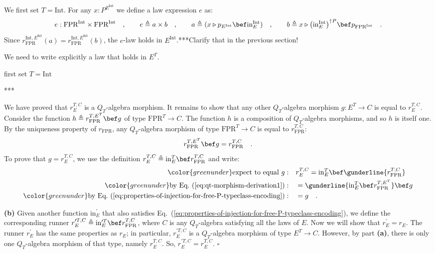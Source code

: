 We first set $T=\text{Int}$. For any $x:P^{E^{\text{Int}}}$ we define
a law expression $e$ as:
\[
e:\text{FPR}^{\text{Int}}\times\text{FPR}^{\text{Int}}\quad,\quad\quad e\triangleq a\times b\quad,\quad\quad a\triangleq(x\triangleright p_{E^{\text{Int}}}\bef\text{in}_{E}^{\text{Int}})\quad,\quad\quad b\triangleq x\triangleright\big(\text{in}_{E}^{\text{Int}}\big)^{\uparrow P}\bef p_{\text{FPR}^{\text{Int}}}\quad.
\]
Since $r_{\text{FPR}}^{\text{Int},E^{\text{Int}}}(a)=r_{\text{FPR}}^{\text{Int},E^{\text{Int}}}(b)$,
the $e$-law holds in $E^{\text{Int}}$.{*}{*}{*}Clarify that in the
previous section! 

We need to write explicitly a law that holds in $E^{T}$.

first set $T=\text{Int}$

{*}{*}{*}

We have proved that $r_{E}^{T,C}$ is a $Q_{T}$-algebra morphism.
It remains to show that any other $Q_{T}$-algebra morphism $g:E^{T}\rightarrow C$
is equal to $r_{E}^{T,C}$. Consider the function $h\triangleq r_{\text{FPR}}^{T,E^{T}}\bef g$
of type $\text{FPR}^{T}\rightarrow C$. The function $h$ is a composition
of $Q_{T}$-algebra morphisms, and so $h$ is itself one. By the uniqueness
property of $r_{\text{FPR}}$, any $Q_{T}$-algebra morphism of type
$\text{FPR}^{T}\rightarrow C$ is equal to $r_{\text{FPR}}^{T,C}$:
\begin{equation}
r_{\text{FPR}}^{T,E^{T}}\bef g=r_{\text{FPR}}^{T,C}\quad.\label{eq:qt-morphism-derivation1}
\end{equation}
To prove that $g=r_{E}^{T,C}$, we use the definition $r_{E}^{T,C}\triangleq\text{in}_{E}^{T}\bef r_{\text{FPR}}^{T,C}$
and write:
\begin{align*}
{\color{greenunder}\text{expect to equal }g:}\quad & r_{E}^{T,C}=\text{in}_{E}^{T}\bef\gunderline{r_{\text{FPR}}^{T,C}}\\
{\color{greenunder}\text{by Eq.~(\ref{eq:qt-morphism-derivation1})}:}\quad & =\gunderline{\text{in}_{E}^{T}\bef r_{\text{FPR}}^{T,E^{T}}}\bef g\\
{\color{greenunder}\text{by Eq.~(\ref{eq:properties-of-injection-for-free-P-typeclass-encoding})}:}\quad & =g\quad.
\end{align*}

\textbf{(b)} Given another function $\text{in}_{E}^{\prime}$ that
also satisfies Eq.~(\ref{eq:properties-of-injection-for-free-P-typeclass-encoding}),
we define the corresponding runner $r_{E}^{\prime T,C}\triangleq\text{in}_{E}^{\prime T}\bef r_{\text{FPR}}^{T,C}$,
where $C$ is any $Q_{T}$-algebra satisfying all the laws of $E$.
Now we will show that $r_{E}^{\prime}=r_{E}$. The runner $r_{E}^{\prime}$
has the same properties as $r_{E}$; in particular, $r_{E}^{\prime T,C}$
is a $Q_{T}$-algebra morphism of type $E^{T}\rightarrow C$. However,
by part \textbf{(a)}, there is only one $Q_{T}$-algebra morphism
of that type, namely $r_{E}^{T,C}$. So, $r_{E}^{\prime T,C}=r_{E}^{T,C}$.
$\square$

